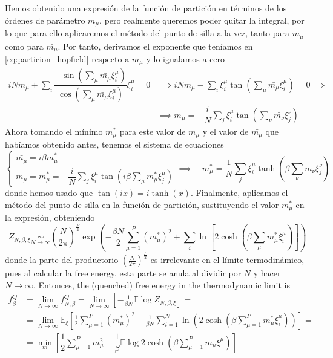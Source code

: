 \noindent
Hemos obtenido una expresión de la función de partición en términos de los órdenes de parámetro $m_{\mu}$, pero realmente queremos poder quitar la integral, por lo que para ello aplicaremos el método del punto de silla a la vez, tanto para $m_{\mu}$ como para $\bar{m_{\mu}}$. Por tanto, derivamos el exponente que teníamos en \ref{eq:particion_hopfield} respecto a $\bar{m_{\mu}}$ y lo igualamos a cero 
\begin{align*}
    iN m_{\mu} + \sum_i \dfrac{-\sin\left( \sum_{\mu} \bar{m_{\mu}} \xi_i^{\mu} \right)}{\cos\left( \sum_{\mu} \bar{m_{\mu}} \xi_i^{\mu} \right)} \xi_i^{\mu} = 0 &\implies iN m_{\mu} - \sum_i\xi_i^{\mu} \tan\left( \sum_{\mu} \bar{m_{\mu}} \xi_i^{\mu} \right)  = 0 \implies \\
    &\implies m_{\mu} = -\dfrac{i}{N} \sum_j \xi_i^{\mu} \tan\left( \sum_{\nu} \bar{m_{\nu}} \xi_j^{\nu} \right) 
\end{align*}
Ahora tomando el mínimo $m_{\mu}^*$ para este valor de $m_{\mu}$ y el valor de $\bar{m_{\mu}}$ que habíamos obtenido antes, tenemos el sistema de ecuaciones
\begin{equation*}
    \begin{cases}
        \bar{m_{\mu}} = i \beta m_{\mu}^* \\
        m_{\mu} =m_{\mu}^*= -\dfrac{i}{N} \sum\limits_j \xi_i^{\mu} \tan\left( i \beta \sum\limits_{\mu} m_{\mu}^* \xi_j^{\mu} \right)
    \end{cases} \implies \quad m_{\mu}^* = \dfrac{1}{N} \sum_j \xi_i^{\mu} \tanh\left( \beta \sum_{\nu} m_{\nu} \xi_j^{\nu} \right)
\end{equation*}
donde hemos usado que $\tan(ix) = i \tanh(x)$. Finalmente, aplicamos el método del punto de silla en la función de partición, sustituyendo el valor $m_{\mu}^*$ en la expresión, obteniendo
\begin{equation*}
    Z_{N,\beta,\xi} \underset{N \to \infty}{\sim} \left(\dfrac{N}{2\pi}\right)^{\frac{P}{2}}\exp \left( -\frac{\beta N}{2} \sum_{\mu=1}^P (m_{\mu}^*)^2 + \sum_{i} \ln \left[ 2 \cosh \left( \beta \sum_{\mu} m_{\mu}^* \xi_i^\mu \right) \right] \right)
\end{equation*}
donde la parte del productorio $\left(\frac{N}{2\pi}\right)^{\frac{P}{2}}$ es irrelevante en el límite termodinámico, pues al calcular la free energy, esta parte se anula al dividir por $N$ y hacer $N \to \infty$. Entonces, the (quenched) free energy in the thermodynamic limit is
\begin{align*}
    f_{\beta}^Q &= \lim_{N \to \infty} f_{N,\beta}^Q = \lim_{N\to \infty}\left[-\frac{1}{\beta N} \mathbb{E} \log Z_{N,\beta,\xi} \right]= \\
    &=\lim_{N \to \infty} \mathbb{E}_{\xi} \left[ \frac{1}{2} \sum_{\mu=1}^P (m_{\mu}^*)^2 - \frac{1}{\beta N} \sum_{i=1}^N \ln \left( 2 \cosh \left( \beta \sum_{\mu=1}^P m_{\mu}^* \xi_i^\mu \right) \right) \right]=\\
    &= \min_{m} \left[ \dfrac{1}{2} \sum_{\mu=1}^P m_{\mu}^2 - \dfrac{1}{\beta} \mathbb{E} \log 2 \cosh\left( \beta \sum_{\mu=1}^P m_{\mu} \xi^{\mu} \right) \right]
\end{align*}
